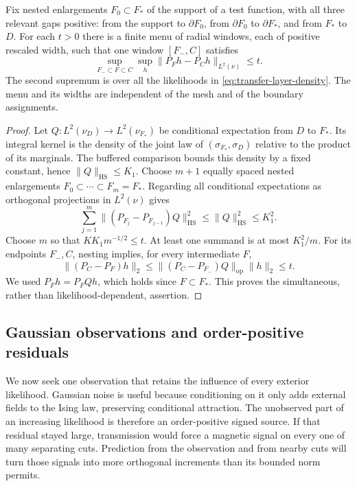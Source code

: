 \begin{lemma}
\label{lem:transfer-window}
Fix nested enlargements $F_0\subset F_*$ of the support of a test function,
with all three relevant gaps positive: from the support to $\partial F_0$,
from $\partial F_0$ to $\partial F_*$, and from $F_*$ to $D$.
For each $t>0$ there is a finite menu of radial windows, each of positive
rescaled width, such that one window $[F_-,C]$ satisfies
\begin{equation}
 \sup_{F_-\subset F\subset C}\sup_h
       \|P_Fh-P_Ch\|_{L^2(\nu)}\leq t.
 \label{eq:transfer-window}
\end{equation}
The second supremum is over all the likelihoods in
\eqref{eq:transfer-layer-density}.  The menu and its widths are independent
of the mesh and of the boundary assignments.
\end{lemma}

\begin{proof}
Let $Q:L^2(\nu_D)\to L^2(\nu_{F_*})$ be conditional expectation from
$D$ to $F_*$.  Its integral kernel is the density of the joint law of
$(\sigma_{F_*},\sigma_D)$ relative to the product of its marginals.
The buffered comparison bounds this density by a fixed constant, hence
$\|Q\|_{\mathrm{HS}}\leq K_1$.  Choose $m+1$ equally spaced nested
enlargements $F_0\subset\cdots\subset F_m=F_*$.  Regarding all
conditional expectations as orthogonal projections in $L^2(\nu)$ gives
\[
 \sum_{j=1}^m\|(P_{F_j}-P_{F_{j-1}})Q\|_{\mathrm{HS}}^2
 \leq\|Q\|_{\mathrm{HS}}^2\leq K_1^2.
\]
Choose $m$ so that $KK_1m^{-1/2}\leq t$.  At least one summand is at
most $K_1^2/m$.  For its endpoints $F_-,C$, nesting implies, for every
intermediate $F$,
\[
 \|(P_C-P_F)h\|_2
 \leq\|(P_C-P_{F_-})Q\|_{\mathrm{op}}\|h\|_2\leq t.
\]
We used $P_Fh=P_FQh$, which holds since $F\subset F_*$.  This proves
the simultaneous, rather than likelihood-dependent, assertion.
\end{proof}

\subsection{Gaussian observations and order-positive residuals}

We now seek one observation that retains the influence of every exterior
likelihood.  Gaussian noise is useful because conditioning on it only adds
external fields to the Ising law, preserving conditional attraction.
The unobserved part of an increasing likelihood is therefore an
order-positive signed source.  If that residual stayed large, transmission
would force a magnetic signal on every one of many separating cuts.
Prediction from the observation and from nearby cuts will turn those
signals into more orthogonal increments than its bounded norm permits.

